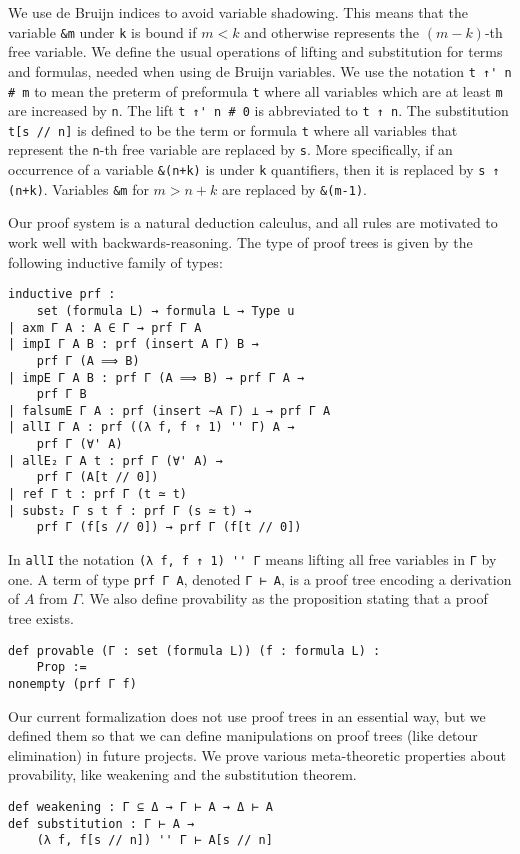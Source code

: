 \documentclass[sigplan,10pt,review, autoref,anonymous]{acmart}
\newcommand{\lil}{\lstinline}
\theoremstyle{definition}
\begin{document}
We use de Bruijn indices to avoid variable shadowing. This means that the variable \lil{&m} under \lil{k} is bound if $m<k$ and otherwise represents the $(m-k)$-th free variable.
We define the usual operations of lifting and substitution for terms and formulas, needed when using de Bruijn variables.
We use the notation \lil{t ↑' n # m} to mean the preterm of preformula \lil{t} where all variables which are at least \lil{m} are increased by \lil{n}.
The lift \lil{t ↑' n # 0} is abbreviated to \lil{t ↑ n}.
The substitution \lil{t[s // n]} is defined to be the term or formula \lil{t} where all variables that represent the \lil{n}-th free variable are replaced by \lil{s}.
More specifically, if an occurrence of a variable \lil{&(n+k)} is under \lil{k} quantifiers, then it is replaced by \lil{s ↑ (n+k)}.
Variables \lil{&m} for $m>n+k$ are replaced by \lil{&(m-1)}.

Our proof system is a natural deduction calculus, and all rules are motivated to work well with backwards-reasoning. The type of proof trees is given by the following inductive family of types:
\begin{lstlisting}
inductive prf :
    set (formula L) → formula L → Type u
| axm Γ A : A ∈ Γ → prf Γ A
| impI Γ A B : prf (insert A Γ) B →
    prf Γ (A ⟹ B)
| impE Γ A B : prf Γ (A ⟹ B) → prf Γ A →
    prf Γ B
| falsumE Γ A : prf (insert ∼A Γ) ⊥ → prf Γ A
| allI Γ A : prf ((λ f, f ↑ 1) '' Γ) A →
    prf Γ (∀' A)
| allE₂ Γ A t : prf Γ (∀' A) →
    prf Γ (A[t // 0])
| ref Γ t : prf Γ (t ≃ t)
| subst₂ Γ s t f : prf Γ (s ≃ t) →
    prf Γ (f[s // 0]) → prf Γ (f[t // 0])
\end{lstlisting}
In \lil{allI} the notation \lil{(λ f, f ↑ 1) '' Γ} means lifting all free variables in \lil{Γ} by one.
A term of type \lil{prf Γ A}, denoted \lil{Γ ⊢ A}, is a proof tree encoding a derivation of $A$ from $\Gamma$.
We also define provability as the proposition stating that a proof tree exists.
\begin{lstlisting}
def provable (Γ : set (formula L)) (f : formula L) :
    Prop :=
nonempty (prf Γ f)
\end{lstlisting}
Our current formalization does not use proof trees in an essential way, but we defined them so that we can define manipulations on proof trees (like detour elimination) in future projects.
We prove various meta-theoretic properties about provability, like weakening and the substitution theorem.
\begin{lstlisting}
def weakening : Γ ⊆ Δ → Γ ⊢ A → Δ ⊢ A
def substitution : Γ ⊢ A →
    (λ f, f[s // n]) '' Γ ⊢ A[s // n]
\end{lstlisting}
\end{document}
